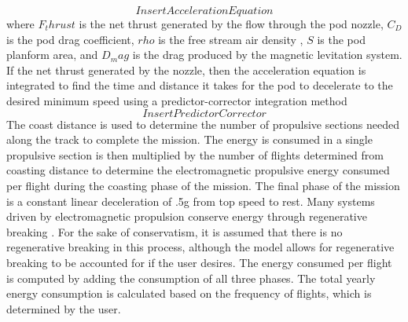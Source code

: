 \begin{equation}
	\label{eq:acceleration}
	Insert Acceleration Equation
\end{equation}
where $F_thrust$ is the net thrust generated by the flow through the pod nozzle, $C_D$ is the pod drag coefficient, $rho$ is the free stream air density , $S$ is the pod planform area, and $D_mag$ is the drag produced by the magnetic levitation system. If the net thrust generated by the nozzle, then the acceleration equation is integrated to find the time and distance it takes for the pod to decelerate to the desired minimum speed using a predictor-corrector integration method
\begin{equation}
	\label{eq:predictor_corrector}
	Insert Predictor Corrector
\end{equation}
The coast distance is used to determine the number of propulsive sections needed along the track to complete the mission. The energy is consumed in a single propulsive section is then multiplied by the number of flights determined from coasting distance to determine the electromagnetic propulsive energy consumed per flight during the coasting phase of the mission. The final phase of the mission is a constant linear deceleration of .5g from top speed to rest. Many systems driven by electromagnetic propulsion conserve energy through regenerative breaking \cite{inductrack}. For the sake of conservatism, it is assumed that there is no regenerative breaking in this process, although the model allows for regenerative breaking to be accounted for if the user desires. The energy consumed per flight is computed by adding the consumption of all three phases. The total yearly energy consumption is calculated based on the frequency of flights, which is determined by the user.

